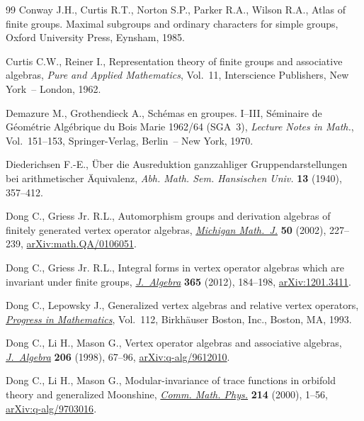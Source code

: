 \documentclass[11pt]{article}
\theoremstyle{definition}
\begin{document}
\begin{thebibliography}{99}
Conway J.H., Curtis R.T., Norton S.P., Parker R.A., Wilson R.A., Atlas of
 finite groups. Maximal subgroups and ordinary characters for simple groups,
 Oxford University Press, Eynsham, 1985.

Curtis C.W., Reiner I., Representation theory of finite groups and associative
 algebras, \textit{Pure and Applied Mathematics}, Vol.~11, Interscience
 Publishers, New York~-- London, 1962.

Demazure M., Grothendieck A., Sch\'{e}mas en groupes. {I}--{III},
 {S}\'{e}minaire de G\'{e}om\'{e}trie Alg\'{e}brique du Bois Marie 1962/64
 (SGA~3), \textit{Lecture Notes in Math.}, Vol.~151--153, Springer-Verlag,
 Berlin~-- New York, 1970.

Diederichsen F.-E., \"{U}ber die {A}usreduktion ganzzahliger
 {G}ruppendarstellungen bei arithmetischer \"{A}quivalenz, \textit{Abh. Math.
 Sem. Hansischen Univ.} \textbf{13} (1940), 357--412.

Dong C., Griess Jr. R.L., Automorphism groups and derivation algebras of
 finitely generated vertex operator algebras, \href{https://doi.org/10.1307/mmj/1028575732}{\textit{Michigan Math.~J.}}
 \textbf{50} (2002), 227--239, \href{https://arxiv.org/abs/math.QA/0106051}{arXiv:math.QA/0106051}.

Dong C., Griess Jr. R.L., Integral forms in vertex operator algebras which are
 invariant under finite groups, \href{https://doi.org/10.1016/j.jalgebra.2012.05.006}{\textit{J.~Algebra}} \textbf{365} (2012),
 184--198, \href{https://arxiv.org/abs/1201.3411}{arXiv:1201.3411}.

Dong C., Lepowsky J., Generalized vertex algebras and relative vertex
 operators, \href{https://doi.org/10.1007/978-1-4612-0353-7}{\textit{Progress in Mathematics}}, Vol.~112, Birkh\"{a}user Boston,
 Inc., Boston, MA, 1993.

Dong C., Li H., Mason G., Vertex operator algebras and associative algebras,
 \href{https://doi.org/10.1006/jabr.1998.7425}{\textit{J.~Algebra}} \textbf{206} (1998), 67--96, \href{https://arxiv.org/abs/q-alg/9612010}{arXiv:q-alg/9612010}.

Dong C., Li H., Mason G., Modular-invariance of trace functions in orbifold
 theory and generalized {M}oonshine, \href{https://doi.org/10.1007/s002200000242}{\textit{Comm. Math. Phys.}} \textbf{214}
 (2000), 1--56, \href{https://arxiv.org/abs/q-alg/9703016}{arXiv:q-alg/9703016}.


\end{thebibliography}
\end{document}
